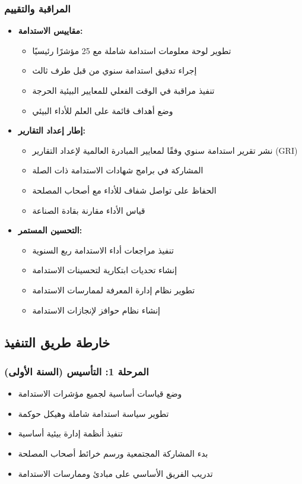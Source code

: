 \subsubsection{المراقبة والتقييم}
\begin{itemize}
    \item \textbf{مقاييس الاستدامة:}
    \begin{itemize}
        \item تطوير لوحة معلومات استدامة شاملة مع 25 مؤشرًا رئيسيًا
        \item إجراء تدقيق استدامة سنوي من قبل طرف ثالث
        \item تنفيذ مراقبة في الوقت الفعلي للمعايير البيئية الحرجة
        \item وضع أهداف قائمة على العلم للأداء البيئي
    \end{itemize}
    
    \item \textbf{إطار إعداد التقارير:}
    \begin{itemize}
        \item نشر تقرير استدامة سنوي وفقًا لمعايير المبادرة العالمية لإعداد التقارير (GRI)
        \item المشاركة في برامج شهادات الاستدامة ذات الصلة
        \item الحفاظ على تواصل شفاف للأداء مع أصحاب المصلحة
        \item قياس الأداء مقارنة بقادة الصناعة
    \end{itemize}
    
    \item \textbf{التحسين المستمر:}
    \begin{itemize}
        \item تنفيذ مراجعات أداء الاستدامة ربع السنوية
        \item إنشاء تحديات ابتكارية لتحسينات الاستدامة
        \item تطوير نظام إدارة المعرفة لممارسات الاستدامة
        \item إنشاء نظام حوافز لإنجازات الاستدامة
    \end{itemize}
\end{itemize}

\subsection{خارطة طريق التنفيذ}

\subsubsection{المرحلة 1: التأسيس (السنة الأولى)}
\begin{itemize}
    \item وضع قياسات أساسية لجميع مؤشرات الاستدامة
    \item تطوير سياسة استدامة شاملة وهيكل حوكمة
    \item تنفيذ أنظمة إدارة بيئية أساسية
    \item بدء المشاركة المجتمعية ورسم خرائط أصحاب المصلحة
    \item تدريب الفريق الأساسي على مبادئ وممارسات الاستدامة
\end{itemize}

